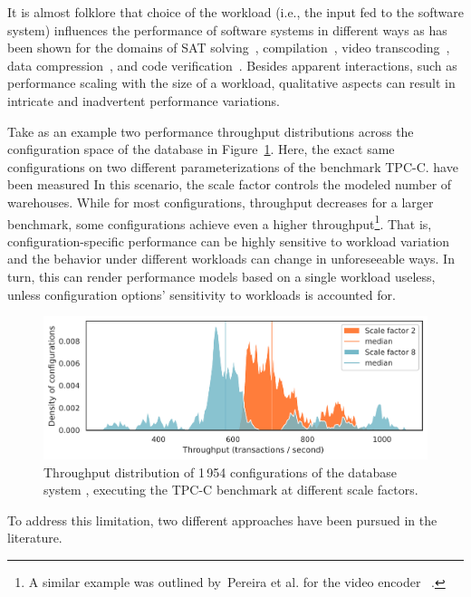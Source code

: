 It is almost folklore that choice of the workload (i.e., the input fed to the software system) influences the performance of software systems in different ways as has been shown for the domains of SAT solving~\cite{falkner_sat_solvers_2015,satzilla_2008}, compilation~\cite{ding_compilation_2015,plotnikov_compilation_2013}, video transcoding~\cite{maxiaguine_workload_2004,alves_sampling_2020}, data compression~\cite{khavari_compression_2019}, and code verification~\cite{koc_satune_2021}. Besides apparent interactions, such as performance scaling with the size of a workload, qualitative aspects can result in intricate and inadvertent performance variations.

{\color{black}
	Take as an example two performance throughput distributions across the configuration space of the database \htwo in Figure~\ref{fig:h2_intro}. Here,  the exact same configurations on two different parameterizations of the benchmark \textsf{TPC-C}. have been measured In this scenario, the scale factor controls the modeled number of warehouses. While for most configurations, throughput decreases for a larger benchmark, some configurations achieve even a higher throughput\footnote{A similar example was outlined by~Pereira et al. for the video encoder \xzwo~\cite{alves_sampling_2020}.}. That is, configuration-specific performance can be highly sensitive to workload variation and the behavior under different workloads can change in unforeseeable ways. In turn, this can render performance models based on a single workload useless, unless configuration options’ sensitivity to workloads is accounted for.
}
\begin{figure}
	\centering
	\includegraphics[width=0.99\linewidth]{images/h2_intro.pdf}
	\caption{Throughput distribution of 1\,954 configurations of the database system \htwo, executing the \textsf{TPC-C} benchmark at different scale factors.}
	\label{fig:h2_intro}
\end{figure}

To address this limitation, two different approaches have been pursued in the literature. 

